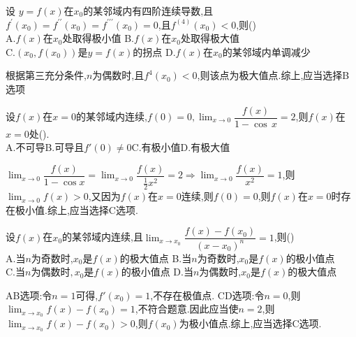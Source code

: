 \documentclass[8pt a4paper, oneside, UTF8]{ctexbook}  %
\begin{document}
\begin{sloppypar}
\begin{solution}
    \end{solution}
    \begin{problem}
    设 $y=f(x)$在$x_{0}$的某邻域内有四阶连续导数,且$f^{\prime}(x_{0})=f^{\prime\prime}(x_{0})=f^{\prime\prime\prime}(x_{0})=0$,且$f^{(4)}\left(x_{0}\right)<0$,则()\\
    A.$f(x)$在$x_{0}$处取得极小值\quad
    B.$f(x)$在$x_{0}$处取得极大值\\
    C.$(x_{0},f(x_{0}))$是$y=f(x)$的拐点\quad
    D.$f(x)$在$x_{0}$的某邻域内单调减少
    \end{problem}
    \begin{solution}
        根据第三充分条件,$n$为偶数时,且$f^4(x_0)<0$,则该点为极大值点.综上,应当选择B选项
    \end{solution}
    \begin{problem}
    设$f(x)$在$x=0$的某邻域内连续,$f(0)=0,\operatorname*{lim}_{x\to0}\dfrac{f(x)}{1-\operatorname{cos}\,x}=2$,则$f(x)$在$x=0$处().\\
    A.不可导\quad B.可导且$f'(0)\neq0$\quad C.有极小值\quad D.有极大值
    \end{problem}
    \begin{solution}
        $\lim_{x\to 0} \dfrac{f(x)}{1-\cos x}=\lim_{x\to 0} \dfrac{f(x)}{\frac{1}{2}x^2}=2  \Rightarrow \lim_{x\to 0} \dfrac{f(x)}{x^2}=1$,则$\lim_{x\to 0}f(x)>0$,又因为$f(x)$在$x=0$连续,则$f(0)=0$,则$f(x)$在$x=0$时存在极小值.综上,应当选择C选项.
    \end{solution}
    \begin{problem}
    设$f(x)$在$x_{0}$的某邻域内连续,且$\operatorname*{lim}_{x\to x_{0}}\dfrac{f(x)-f(x_{0})}{(x-x_{0})^{n}}=1$,则()\\
    A.当$n$为奇数时,$x_{0}$是$f(x)$的极大值点\quad
    B.当$n$为奇数时,$x_{0}$是$f(x)$的极小值点\\
    C.当$n$为偶数时$,x_{0}$是$f(x)$的极小值点\quad
    D.当$n$为偶数时,$x_{0}$是$f(x)$的极大值点
    \end{problem}
    \begin{solution}
        AB选项:令$n=1$可得,$f'(x_0)=1$,不存在极值点. CD选项:令$n=0$,则$\lim_{x\to x_0}f(x)-f(x_0)=1$,不符合题意.因此应当使$n=2$,则$\lim_{x\to x_0}f(x)-f(x_0)>0$,则$f(x_0)$为极小值点.综上,应当选择C选项.
    \end{solution}

\end{sloppypar}
\end{document}
